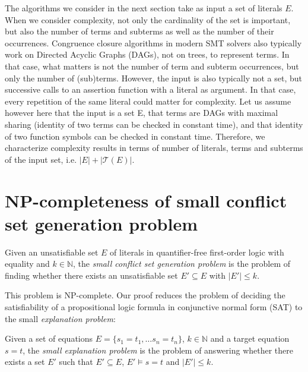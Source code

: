 \documentclass[smallextended]{svjour3}
\begin{document}
The algorithms we consider in the next section take as input a set of literals $E$. %
When we consider complexity, not only the cardinality of the set is important, but also the number of terms and subterms as well as the number of their occurrences. 
Congruence closure algorithms in modern SMT solvers also typically work on Directed Acyclic Graphs (DAGs), not on trees, to represent terms. In that case, what matters is not the number of term and subterm occurrences, but only the number of (sub)terms. However, the input is also typically not a set, but successive calls to an assertion function with a literal as argument. In that case, every repetition of the
same literal could matter for complexity. 
Let us assume however here that the input is a set E, that terms are DAGs with maximal sharing (identity of two terms can be checked in constant time), and that identity of two function symbols can be checked in constant time. 
Therefore, we characterize complexity results in terms of number of literals, terms and subterms of the input set, i.e. $|E| + |\mathcal{T}(E)|$.

\section*{NP-completeness of small conflict set generation problem}
\label{sec:npcomplete}



\begin{definition}
Given an unsatisfiable set $E$ of literals in quantifier-free first-order logic
with equality and $k \in \mathbb{N}$, the \emph{small conflict set generation
  problem} is the problem of finding whether there exists an unsatisfiable set
$E' \subseteq E$ with $|E'| \leq k$.
\end{definition}
\noindent This problem is NP-complete.  Our proof reduces the problem
of deciding the satisfiability of a propositional logic formula in conjunctive
normal form (SAT) to the small \emph{explanation problem}:
\begin{definition}
Given a set of equations $E = \{ s_1=t_1,\ldots s_n=t_n\}$, $k \in
\mathbb{N}$ and a target equation $s = t$, the \emph{small explanation problem}
is the problem of answering whether there exists a set $E'$ such that $E'
\subseteq E$, $E' \models s = t$ and $|E'| \leq k$.
\end{definition}
\end{document}

